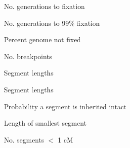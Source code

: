 \documentclass[aspectratio=169,12pt,t]{beamer}
\begin{document}
\begin{frame}[c]{No. generations to fixation}

\note{
}

\end{frame}

\begin{frame}[c]{No. generations to 99\% fixation}

\note{
}

\end{frame}

\begin{frame}[c]{Percent genome not fixed}

\note{
}

\end{frame}

\begin{frame}[c]{No. breakpoints}

\note{
}

\end{frame}

\begin{frame}[c]{Segment lengths}

\note{
}

\end{frame}

\begin{frame}[c]{Segment lengths}

\note{
}

\end{frame}

\begin{frame}[c]{Probability a segment is inherited intact}

\note{
}

\end{frame}

\begin{frame}[c]{Length of smallest segment}

\note{
}

\end{frame}

\begin{frame}[c]{No. segments $<$ 1 cM}

\note{
}

\end{frame}
\end{document}

